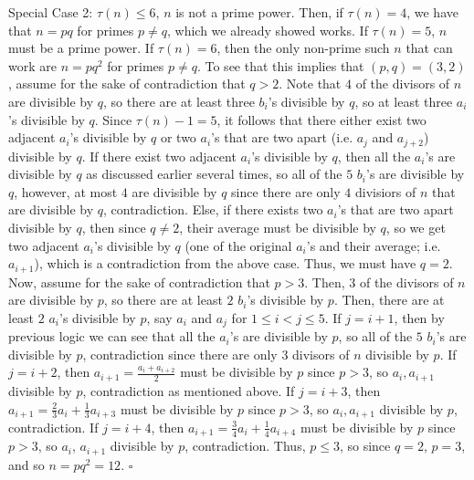 \documentclass[a4paper]{article}
\begin{document}
\begin{question*}[c]{}
{Special Case 2: $\tau(n) \leq 6$, $n$ is not a prime power.
Then, if $\tau(n) = 4$, we have that $n = pq$ for primes $p\neq q$, which we already showed works. If $\tau(n) = 5$, $n$ must be a prime power. If $\tau(n) = 6$, then the only non-prime such $n$ that can work are $n = pq^2$ for primes $p\neq q$. To see that this implies that $(p, q) = (3, 2)$, assume for the sake of contradiction that $q> 2$. Note that $4$ of the divisors of $n$ are divisible by $q$, so there are at least three $b_i$'s divisible by $q$, so at least three $a_i$'s divisible by $q$. Since $\tau(n)-1 = 5$, it follows that there either exist two adjacent $a_i$'s divisible by $q$ or two $a_i$'s that are two apart (i.e. $a_j$ and $a_{j+2}$) divisible by $q$. If there exist two adjacent $a_i$'s divisible by $q$, then all the $a_i$'s are divisible by $q$ as discussed earlier several times, so all of the $5$ $b_i$'s are divisible by $q$, however, at most $4$ are divisible by $q$ since there are only $4$ divisiors of $n$ that are divisible by $q$, contradiction. Else, if there exists two $a_i$'s that are two apart divisible by $q$, then since $q\neq 2$, their average must be divisible by $q$, so we get two adjacent $a_i$'s divisible by $q$ (one of the original $a_i$'s and their average; i.e. $a_{i+1}$), which is a contradiction from the above case. Thus, we must have $q = 2$. Now, assume for the sake of contradiction that $p > 3$. Then, $3$ of the divisors of $n$ are divisible by $p$, so there are at least $2$ $b_i$'s divisible by $p$. Then, there are at least $2$ $a_i$'s divisible by $p$, say $a_i$ and $a_j$ for $1\leq i < j\leq 5$. If $j = i+1$, then by previous logic we can see that all the $a_i$'s are divisible by $p$, so all of the $5$ $b_i$'s are divisible by $p$, contradiction since there are only $3$ divisors of $n$ divisible by $p$. If $j = i+2$, then $a_{i+1} = \frac{a_i + a_{i+2}}{2}$ must be divisible by $p$ since $p > 3$, so $a_i, a_{i+1}$ divisible by $p$, contradiction as mentioned above. If $j = i+3$, then $a_{i+1} = \frac{2}{3}a_i + \frac{1}{3}a_{i+3}$ must be divisible by $p$ since $p > 3$, so $a_i, a_{i+1}$ divisible by $p$, contradiction. If $j = i+4$, then $a_{i+1} = \frac{3}{4}a_i + \frac{1}{4}a_{i+4}$ must be divisible by $p$ since $p > 3$, so $a_i$, $a_{i+1}$ divisible by $p$, contradiction. Thus, $p \leq 3$, so since $q = 2$, $p = 3$, and so $n=pq^2 = 12$. $\square$

}
\end{question*}
\end{document}
